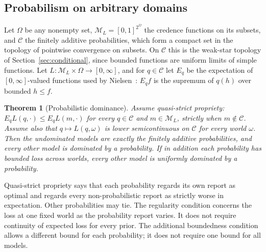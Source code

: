 \documentclass[11pt]{article}
\newtheorem{theorem}{Theorem}[section]
\theoremstyle{definition}
\theoremstyle{remark}
\newcommand{\M}{\mathcal M}
\newcommand{\C}{\mathcal C}
\begin{document}
\subsection{Probabilism on arbitrary domains}\label{sec:nielsen} Let $\Omega$ be any nonempty set, $\M_L=[0,1]^{2^\Omega}$ the credence functions on its subsets, and $\C$ the finitely additive probabilities, which form a compact set in the topology of pointwise convergence on subsets. On $\C$ this is the weak-star topology of Section~\ref{sec:conditional}, since bounded functions are uniform limits of simple functions. Let $L:\M_L\times\Omega\to[0,\infty]$, and for $q\in\C$ let $E_q$ be the expectation of $[0,\infty]$-valued functions used by Nielsen~\cite[Appendix A]{Nielsen}: $E_qf$ is the supremum of $q(h)$ over bounded $h\le f$. 
\begin{theorem}[Probabilistic dominance]\label{thm:nielsen}
Assume \emph{quasi-strict propriety}: $E_qL(q,\cdot)\le E_qL(m,\cdot)$ for every $q\in\C$ and $m\in\M_L$, strictly when $m\notin\C$. Assume also that $q\mapsto L(q,\omega)$ is lower semicontinuous on $\C$ for every world $\omega$. Then the undominated models are exactly the finitely additive probabilities, and every other model is dominated by a probability. If in addition each probability has bounded loss across worlds, every other model is uniformly dominated by a probability.
\end{theorem}
Quasi-strict propriety says that each probability regards its own report as optimal and regards every non-probabilistic report as strictly worse in expectation. Other probabilities may tie. The regularity condition concerns the loss at one fixed world as the probability report varies. It does not require continuity of expected loss for every prior. The additional boundedness condition allows a different bound for each probability; it does not require one bound for all models.
\end{document}
